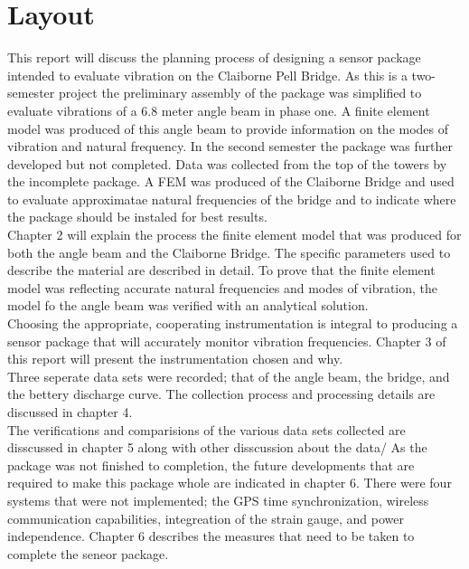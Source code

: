 \section{Layout} 

This report will discuss the planning process of designing a sensor package intended to evaluate vibration on the Claiborne Pell Bridge. As this is a two-semester project the preliminary assembly of the package was simplified to evaluate vibrations of a 6.8 meter angle beam in phase one. A finite element model was produced of this angle beam to provide information on the modes of vibration and natural frequency. In the second semester the package was further developed but not completed. Data was collected from the top of the towers by the incomplete package. A FEM was produced of the Claiborne Bridge and used to evaluate approximatae natural frequencies of the bridge and to indicate where the package should be instaled for best results. \\

\indent Chapter 2 will explain the process the finite element model that was produced for both the angle beam and the Claiborne Bridge. The specific parameters  used to describe the material are described in detail. To prove that the finite element model was reflecting accurate natural frequencies and modes of vibration, the model fo the angle beam was verified with an analytical solution. \\
\indent Choosing the appropriate, cooperating instrumentation is integral to producing a sensor package that will accurately monitor vibration frequencies. Chapter 3 of this report will present the instrumentation chosen and why. \\
\indent Three seperate data sets were recorded; that of the angle beam, the bridge, and the bettery discharge curve. The collection process and processing details are discussed in chapter 4. \\ 
\indent The verifications and comparisions of the various data sets collected are disscussed in chapter 5 along with other disscussion about the data/ 
\indent As the package was not finished to completion, the future developments that are required to make this package whole are indicated in chapter 6. There were four systems that were not implemented; the GPS time synchronization, wireless communication capabilities, integreation of the strain gauge, and power independence. Chapter 6 describes the measures that need to be taken to complete the seneor package.\\

